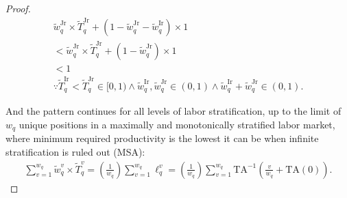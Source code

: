 \documentclass[hidelinks, nonatbib]{elsarticle}
\begin{document}
\begin{lemma}
\begin{proof}
\begin{align}
        \tilde{w}_{q}^{\text{Jr}}
        \times
        \tilde{T}_{q}^{\text{Jr}}
        +
        (
            1 - \tilde{w}_{q}^{\text{Jr}} - \tilde{w}_{q}^{\text{Ir}}
        )
        \times
        1
        \\
        <
        \tilde{w}_{q}^{\text{Jr}}
        \times
        \tilde{T}_{q}^{\text{Jr}}
        +
        (
            1 - \tilde{w}_{q}^{\text{Jr}}
        )
        \times
        1
        \\
        <
        1
        \\
        \because
        \tilde{T}_{q}^{\text{Ir}}
        <
        \tilde{T}_{q}^{\text{Jr}}
        \in
        [0,1)
        \land
        \tilde{w}_{q}^{\text{Ir}},
        \tilde{w}_{q}^{\text{Jr}}
        \in
        (0,1)
        \land
        \tilde{w}_{q}^{\text{Ir}}
        +
        \tilde{w}_{q}^{\text{Jr}}
        \in
        (0,1)
        .
        \end{align}
        
        And the pattern continues for all levels of labor stratification, up to the limit of $w_q$ unique positions in a maximally and monotonically stratified labor market, where minimum required productivity is the lowest it can be when infinite stratification is ruled out (MSA):
        \begin{gather}
        \sum_{v=1}^{w_q}{
            \tilde{w}_{q}^{v}
            \times
            \tilde{T}_{q}^{v}
        }
        =
        \left(
            \frac{1}{w_q}
        \right)
        \sum_{v=1}^{w_q}{
            \ell_{q}^{v}
        }
        =
        \left(
            \frac{1}{w_q}
        \right)
        \sum_{v=1}^{w_q}{
            \text{TA}^{-1}\left(
            \frac{v}{w_q}
            +
            \text{TA}(0)
        \right)
        }
        .
        \end{gather}
        

\end{proof}
\end{lemma}
\end{document}
